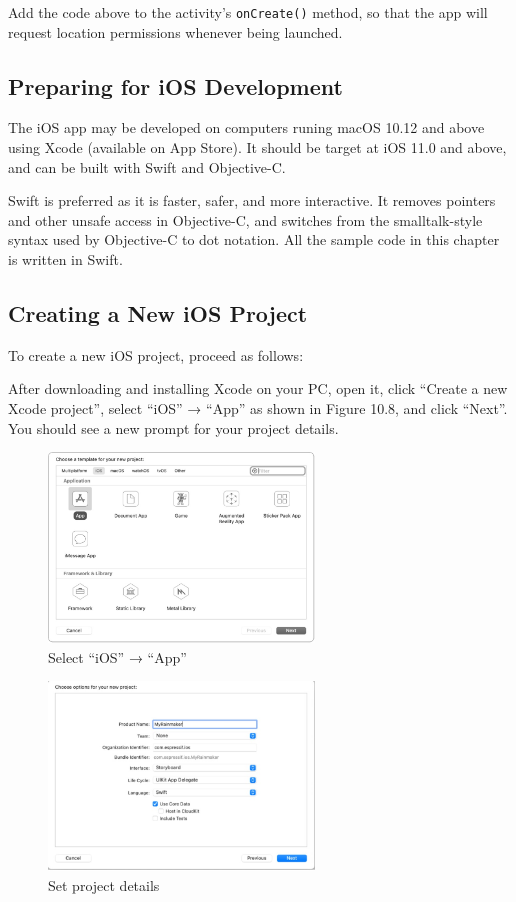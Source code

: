 \documentclass[a4paper,12pt,openany]{book}
\begin{document}
Add the code above to the activity’s \verb|onCreate()| method, so that the app will request location permissions whenever being launched.

\subsection{Preparing for iOS Development}
The iOS app may be developed on computers runing macOS 10.12 and above using Xcode (available on App Store). It should be target at iOS 11.0 and above, and can be built with Swift and Objective-C.

Swift is preferred as it is faster, safer, and more interactive. It removes pointers and other unsafe access in Objective-C, and switches from the smalltalk-style syntax used by Objective-C to dot notation. All the sample code in this chapter is written in Swift.

\subsection{Creating a New iOS Project}
To create a new iOS project, proceed as follows:

After downloading and installing Xcode on your PC, open it, click “Create a new Xcode project”, select “iOS” → “App” as shown in Figure 10.8, and click “Next”. You should see a new prompt for your project details.

\begin{figure}[ht]
    \centering
    \includegraphics[width=0.63\textwidth]{D10Z/10-8}
    \caption{Select “iOS” → “App”}
\end{figure}

\begin{figure}[h!]
    \centering
    \includegraphics[width=0.63\textwidth,frame]{D10Z/10-9}
    \caption{Set project details}
\end{figure}
\end{document}
